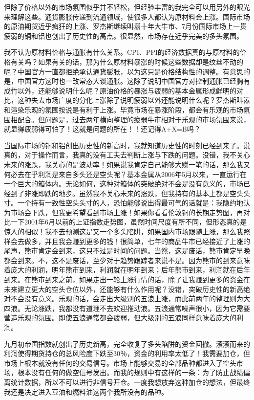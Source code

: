 但除了价格以外的市场氛围似乎并不轻松，但经验丰富的我完全可以用另外的眼光来理解这些。通货膨胀传递到流通领域，使很多人都认为原材料会上涨。国际市场的原油期货近乎疯狂的上涨、罗杰斯继续叫嚣十年大牛市、7月份国际市场上一贯疲弱的铜和铝也创出了历史性的高点。很显然，市场存在近乎完美的多头氛围。

我不认为原材料价格与通胀有什么关系。CPI、PPI的经济数据真的与原材料的价格有关吗？如果有关的话，那为什么原材料暴涨的时候这些数据却是纹丝不动的呢？中国官方一直都拒绝承认通货膨胀，以为这只是价格结构性的调整。有意思的是，中国官方这时也一改常态大谈通胀。这除了说明中国官方对控制通胀已经胸有成竹以外，还能够说明什么呢？原油价格的暴涨与疲弱的基本金属形成鲜明的对比，这种失去市场广度的分化上涨除了说明疲弱以外还能说明什么呢？罗杰斯叫嚣和渲染乐观的氛围按说是有利于上涨。毕竟市场在暴涨阶段，都会有乐观的市场氛围相配合。但问题是，过去两年横向整理的疲弱牛市相对于乐观的市场氛围来说，就显得疲弱得可怕了！这就是问题的所在！！还记得A+X=B吗？

当国际市场的铜和铝创出历史性的新高时，我就知道历史性的时刻已经到来了。说真的，对于操作而言，我真的没有工夫去判断上涨与下跌的问题。没错，我不关心未来的涨跌，我关心的是波动率！如果说我肯定自己能够大赚一笔的话，那么我又何必去在乎利润是来自多头还是空头呢？基本金属从2006年5月以来，一直运行在一个巨大的箱体内。无论如何，这种对箱体的突破绝对不会是没有意义的，市场已经到了非涨即跌的地步。虽然我不关心未来的涨跌，但我持有的基本上都是空头头寸。一个持有一致性空头头寸的人，恐怕能够说出得最可气的话就是：我隐约地认为市场会下跌，但我更希望看到市场上涨！如果你看看伦敦铜的长期走势图，再对比一下2001年6月以前的上证指数走势图，虽然时间尺度有所不同，但形态真的是惊人的相似！我不去预测这是又一个多头陷阱，如果国内市场跟随上涨，那么我照样会去做多，并且我会赚到更多的钱！很简单，七年的商品牛市已经接近了上涨的尾声，熊市肯定会到来，这只不过是时间的问题。当然，这是废话，熊市肯定早晚都会到来。不，这不是废话，至少对于趋势跟踪者来说不是。因为熊市的到来意味着庞大的利润，明年熊市到来，利润就在明年到来；后年熊市到来，利润就在后年到来。在熊市到来之前，如果走出一轮上涨行情的话，除了让我赚到更多的资金在未来建立更大的空头仓位以外，还能够有什么作用呢？没错，突破历史性的新高绝对不会没有意义。乐观的话，会走出大级别的五浪上涨，而此前两年的整理则为大四浪。无论涨跌，我都没有道理不去欢迎推动浪。五浪通常噪声很小，因为它需要营造乐观的氛围。即使五浪通常都会疲弱，但大级别的五浪同样意味着庞大的利润。

九月初帝国指数就创出了历史新高，完全收复了多头陷阱的资金回撤。滚滚而来的利润使得期货持仓的总风险度下跌至30％，资金的利用率太低了！我需要加仓，但市场上根本就没有任何的交易信号。市场上能够交易的全部品种都进入了空头市场，根本没有任何的做空信号发出。而我的规则中有这样的一条：为了防止战绩偏离统计数据，所以不可以进行非信号开仓。一度我想放弃这种加仓的想法，但最终我还是决定进入豆油和燃料油这两个我所没有的品种。

